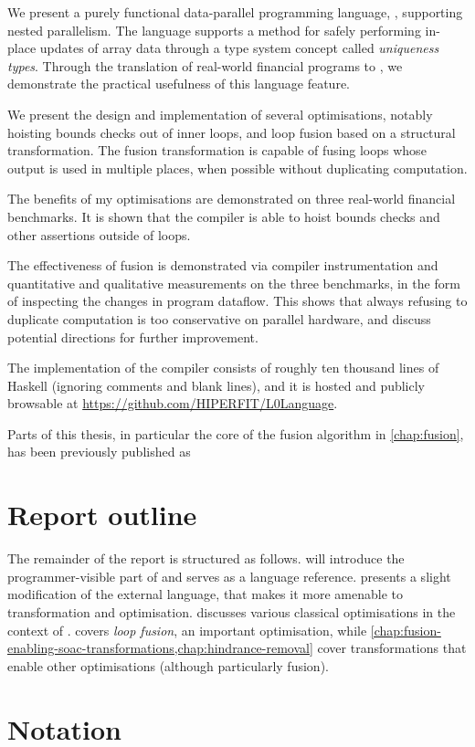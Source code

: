 We present a purely functional data-parallel programming language,
\LO{}, supporting nested parallelism.  The language supports a method
 for safely performing in-place updates of array data through
a type system concept called \textit{uniqueness types}.  Through the
translation of real-world financial programs to \LO{}, we demonstrate
the practical usefulness of this language feature.

We present the design and implementation of several optimisations,
notably hoisting bounds checks out of inner loops, and loop fusion
based on a structural transformation.  The fusion transformation is
capable of fusing loops whose output is used in multiple places, when
possible without duplicating computation.

The benefits of my optimisations are demonstrated on three real-world
financial benchmarks.  It is shown that the compiler is able to hoist
bounds checks and other assertions outside of loops.

The effectiveness of fusion is demonstrated via compiler
instrumentation and quantitative and qualitative measurements on the
three benchmarks, in the form of inspecting the changes in program
dataflow.  This shows that always refusing to duplicate computation is
too conservative on parallel hardware, and discuss potential
directions for further improvement.

The implementation of the \LO{} compiler consists of roughly ten
thousand lines of Haskell (ignoring comments and blank lines), and it
is hosted and publicly browsable at
\url{https://github.com/HIPERFIT/L0Language}.

Parts of this thesis, in particular the core of the fusion algorithm
in \cref{chap:fusion}, has been previously published as

\begin{quote}
\end{quote}

\section{Report outline}

The remainder of the report is structured as follows.
 will introduce the
programmer-visible part of \LO{} and serves as a language reference.
 presents a slight modification of the external
language, that makes it more amenable to transformation and
optimisation.   discusses various
classical optimisations in the context of \LO{}.  
covers \textit{loop fusion}, an important optimisation, while
\cref{chap:fusion-enabling-soac-transformations,chap:hindrance-removal}
cover transformations that enable other optimisations (although
particularly fusion).

\section{Notation}


